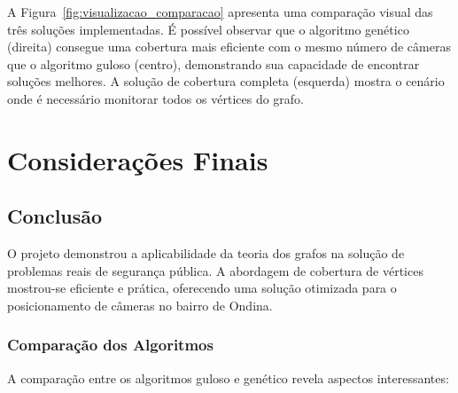 \documentclass[12pt, a4paper]{report}
\begin{document}
A Figura~\ref{fig:visualizacao_comparacao} apresenta uma comparação visual das três soluções implementadas. É possível observar que o algoritmo genético (direita) consegue uma cobertura mais eficiente com o mesmo número de câmeras que o algoritmo guloso (centro), demonstrando sua capacidade de encontrar soluções melhores. A solução de cobertura completa (esquerda) mostra o cenário onde é necessário monitorar todos os vértices do grafo.

\chapter{Considerações Finais}

\section{Conclusão}
O projeto demonstrou a aplicabilidade da teoria dos grafos na solução de problemas reais de segurança pública. A abordagem de cobertura de vértices mostrou-se eficiente e prática, oferecendo uma solução otimizada para o posicionamento de câmeras no bairro de Ondina.

\subsection{Comparação dos Algoritmos}
A comparação entre os algoritmos guloso e genético revela aspectos interessantes:
\end{document}
